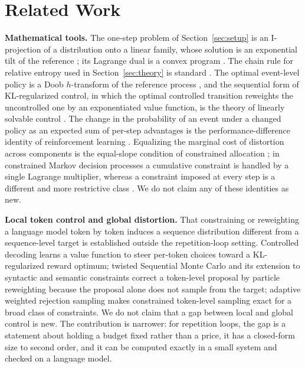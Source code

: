 \documentclass[make,article,submit,pdftex]{Definitions/mdpi}
\begin{document}
\section{Related Work}\label{sec:related}

\textbf{Mathematical tools.} The one-step problem of Section~\ref{sec:setup} is an I-projection of a distribution onto a linear family, whose solution is an exponential tilt of the reference \cite{csiszar1975idivergence}; its Lagrange dual is a convex program \cite{boyd2004convex}. The chain rule for relative entropy used in Section~\ref{sec:theory} is standard \cite{cover2006elements}. The optimal event-level policy is a Doob $h$-transform of the reference process \cite{doob1957conditional}, and the sequential form of KL-regularized control, in which the optimal controlled transition reweights the uncontrolled one by an exponentiated value function, is the theory of linearly solvable control \cite{kappen2005linear,todorov2007linearly}. The change in the probability of an event under a changed policy as an expected sum of per-step advantages is the performance-difference identity of reinforcement learning \cite{kakade2002approximately}. Equalizing the marginal cost of distortion across components is the equal-slope condition of constrained allocation \cite{cover2006elements,boyd2004convex}; in constrained Markov decision processes a cumulative constraint is handled by a single Lagrange multiplier, whereas a constraint imposed at every step is a different and more restrictive class \cite{altman1999constrained,achiam2017constrained}. We do not claim any of these identities as new.

\textbf{Local token control and global distortion.} That constraining or reweighting a language model token by token induces a sequence distribution different from a sequence-level target is established outside the repetition-loop setting. Controlled decoding \cite{mudgal2024controlled} learns a value function to steer per-token choices toward a KL-regularized reward optimum; twisted Sequential Monte Carlo \cite{zhao2024twisted} and its extension to syntactic and semantic constraints \cite{loula2025syntactic} correct a token-level proposal by particle reweighting because the proposal alone does not sample from the target; adaptive weighted rejection sampling \cite{lipkin2025awrs} makes constrained token-level sampling exact for a broad class of constraints. We do not claim that a gap between local and global control is new. The contribution is narrower: for repetition loops, the gap is a statement about holding a budget fixed rather than a price, it has a closed-form size to second order, and it can be computed exactly in a small system and checked on a language model.
\end{document}

